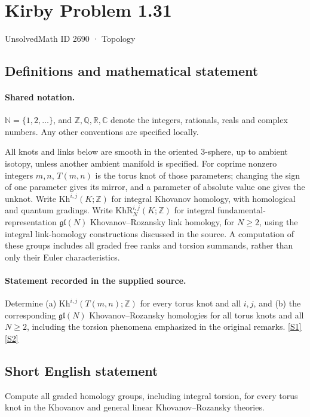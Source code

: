\documentclass[11pt]{article}
\newcommand{\sref}[2]{\hyperlink{source:#1:#2}{[S#2]}}
\begin{document}
\setcounter{section}{2689}
\section{Kirby Problem 1.31}\label{2690}
{\small\sffamily UnsolvedMath ID 2690 · Topology}
\subsection{Definitions and mathematical statement}

\paragraph{Shared notation.}$\mathbb N=\{1,2,\ldots\}$, and $\mathbb Z,\mathbb Q,\mathbb R,\mathbb C$ denote the integers, rationals, reals and complex numbers. Any other conventions are specified locally.


All knots and links below are smooth in the oriented $3$-sphere, up to ambient isotopy, unless another ambient manifold is specified. For coprime nonzero integers $m,n$, $T(m,n)$ is the torus knot of those parameters; changing the sign of one parameter gives its mirror, and a parameter of absolute value one gives the unknot. Write $\mathrm{Kh}^{i,j}(K;\mathbb Z)$ for integral Khovanov homology, with homological and quantum gradings. Write $\mathrm{KhR}_{N}^{i,j}(K;\mathbb Z)$ for integral fundamental-representation $\mathfrak{gl}(N)$ Khovanov--Rozansky link homology, for $N\geq2$, using the integral link-homology constructions discussed in the source. A computation of these groups includes all graded free ranks and torsion summands, rather than only their Euler characteristics.
\paragraph{Statement recorded in the supplied source.}
Determine (a) $\mathrm{Kh}^{i,j}(T(m,n);\mathbb Z)$ for every torus knot and all $i,j$, and (b) the corresponding $\mathfrak{gl}(N)$ Khovanov--Rozansky homologies for all torus knots and all $N\geq2$, including the torsion phenomena emphasized in the original remarks. \sref{2690}{1}\sref{2690}{2}
\subsection{Short English statement}
Compute all graded homology groups, including integral torsion, for every torus knot in the Khovanov and general linear Khovanov--Rozansky theories.
\end{document}
